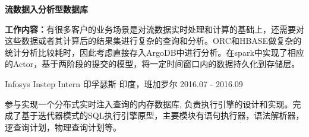 \begin{cventries}
    \cventry
    {\textbf{流数据入分析型数据库}}{}{}{}
    {
        \begin{cvitems}
          \item {\textbf{工作内容：}有很多客户的业务场景是对流数据实时处理和计算的基础上，还需要对这些数据或者其计算后的结果集进行复杂的查询和分析。ORC和HBASE做复杂的统计分析比较耗时，因此考虑直接存入ArgoDB中进行分析。在spark中实现了相应的Actor，基于两阶段的提交的模型，将一定时间窗口内的数据持久化到存储层。}
        \end{cvitems}
    }

\end{cventries}

\begin{cventries}
  \cventry
    {Infosys Instep Intern}
    {印孚瑟斯}
    {印度，班加罗尔}
    {2016.07 - 2016.09}
    {
      \begin{cvitems}
        \item {参与实现一个分布式实时注入查询的内存数据库, 负责执行引擎的设计和实现。完成了基于迭代器模式的SQL执行引擎原型，主要模块有语句执行器，语法解析器，逻查询计划，物理查询计划等。}
      \end{cvitems}
    }
\end{cventries}


